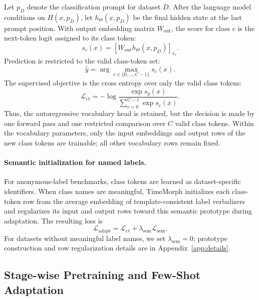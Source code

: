 \documentclass{article}
\begin{document}
Let $p_D$ denote the classification prompt for dataset $D$. After the language
model conditions on $H(x,p_D)$, let $h_{\Theta}(x,p_D)$ be the final hidden state
at the last prompt position. With output embedding matrix $W_{\mathrm{out}}$, the
score for class $c$ is the next-token logit assigned to its class token:
\begin{equation}
\label{eq:class-score}
s_c(x)
=
\left[
W_{\mathrm{out}}h_{\Theta}(x,p_D)
\right]_{v_c}.
\end{equation}
Prediction is restricted to the valid class-token set:
\begin{equation}
\label{eq:class-pred}
\hat{y}
=
\arg\max_{c\in\{0,\ldots,C-1\}} s_c(x).
\end{equation}
The supervised objective is the cross entropy over only the valid class tokens:
\begin{equation}
\label{eq:class-token-loss}
\mathcal{L}_{\mathrm{ct}}
=
-\log
\frac{\exp s_y(x)}
{\sum_{c=0}^{C-1}\exp s_c(x)}.
\end{equation}
Thus, the autoregressive vocabulary head is retained, but the decision is made by
one forward pass and one restricted comparison over $C$ valid class tokens.
Within the vocabulary parameters, only the input embeddings and output rows of
the new class tokens are trainable; all other vocabulary rows remain fixed.

\paragraph{Semantic initialization for named labels.}
For anonymous-label benchmarks, class tokens are learned as dataset-specific
identifiers. When class names are meaningful, TimeMorph initializes each
class-token row from the average embedding of template-consistent label
verbalizers and regularizes its input and output rows toward this semantic
prototype during adaptation. The resulting loss is
\begin{equation}
\label{eq:adapt-loss}
\mathcal{L}_{\mathrm{adapt}}
=
\mathcal{L}_{\mathrm{ct}}
+
\lambda_{\mathrm{sem}}\mathcal{L}_{\mathrm{sem}}.
\end{equation}
For datasets without meaningful label names, we set $\lambda_{\mathrm{sem}}=0$;
prototype construction and row regularization details are in
Appendix~\ref{app:details}.

\subsection{Stage-wise Pretraining and Few-Shot Adaptation}
\label{sec:stage-wise-transfer}
\end{document}
